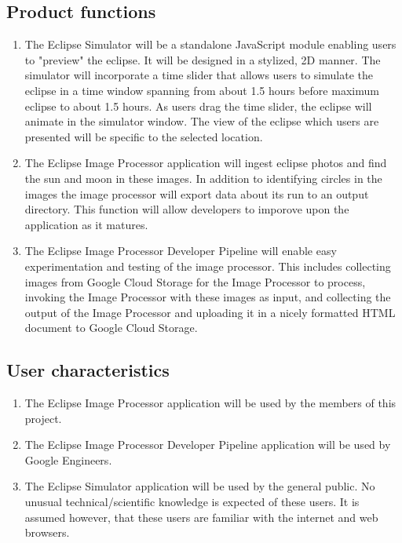 \documentclass[10pt, onecolumn, draftclsnofoot, letterpaper, compsoc]{IEEEtran}
\begin{document}
\subsection{Product functions}
	\begin{enumerate}
		\item The Eclipse Simulator will be a standalone JavaScript
		module enabling users to "preview" the eclipse. It will be
		designed in a stylized, 2D manner. The simulator will
		incorporate a time slider that allows users to simulate the
		eclipse in a time window spanning from about 1.5 hours before maximum
        eclipse to about 1.5 hours. As users drag the time
		slider, the eclipse will animate in the simulator window.
		The view of the eclipse which users are presented will be
		specific to the selected location.

		\item The Eclipse Image Processor application will ingest eclipse
		photos and find the sun and moon in these images. In addition to
        identifying circles in the images the image processor will export
        data about its run to an output directory. This function will allow
        developers to imporove upon the application as it matures.

		\item The Eclipse Image Processor Developer Pipeline will enable easy
        experimentation and testing of the image processor. This includes
		collecting images from Google Cloud Storage for the Image Processor to process,
		invoking the Image Processor with these images as input, and collecting
		the output of the Image Processor and uploading it in a nicely formatted
        HTML document to Google Cloud Storage.

	\end{enumerate}

\subsection{User characteristics}
	\begin{enumerate}
		\item The Eclipse Image Processor application will be used by
            the members of this project.

		\item The Eclipse Image Processor Developer Pipeline application will be
            used by Google Engineers.

		\item The Eclipse Simulator application will be used by the
			general public. No unusual technical/scientific knowledge is
			expected of these users. It is assumed however, that these users
			are familiar with the internet and web browsers.
	\end{enumerate}
\end{document}

